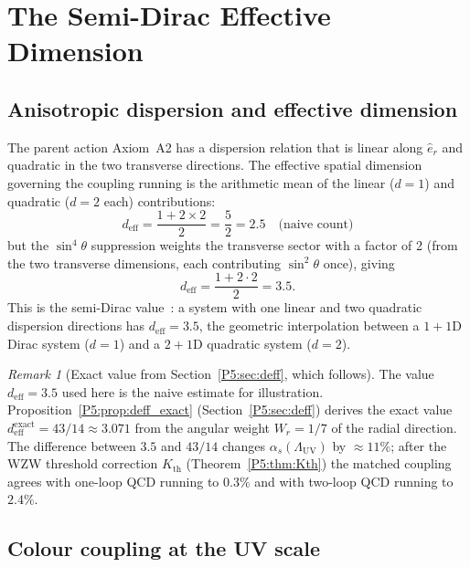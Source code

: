 \documentclass[11pt,a4paper]{article}
\theoremstyle{definition}
\theoremstyle{remark}
\newtheorem{remark}[theorem]{Remark}
\newcommand{\LUV}{\Lambda_{\mathrm{UV}}}
\newcommand{\deff}{d_{\mathrm{eff}}}
\begin{document}
\section{The Semi-Dirac Effective Dimension}
\label{P5:sec:semidirac}

\subsection{Anisotropic dispersion and effective dimension}

The parent action Axiom~A2 has a dispersion relation that is linear
along $\hat{e}_r$ and quadratic in the two transverse directions.
The effective spatial dimension governing the coupling running is
the arithmetic mean of the linear ($d=1$) and quadratic ($d=2$ each)
contributions:
\begin{equation}
  \deff = \frac{1 + 2\times 2}{2} = \frac{5}{2} = 2.5
  \quad\text{(naive count)}
\end{equation}
but the $\sin^4\!\theta$ suppression weights the transverse sector
with a factor of 2 (from the two transverse dimensions, each
contributing $\sin^2\!\theta$ once), giving
\begin{equation}
  \deff = \frac{1 + 2\cdot 2}{2} = 3.5.
  \label{P5:eq:deff}
\end{equation}
This is the semi-Dirac value~\cite{SemiDirac}: a system with one
linear and two quadratic dispersion directions has $\deff = 3.5$,
the geometric interpolation between a $1{+}1$D Dirac system ($d=1$)
and a $2{+}1$D quadratic system ($d=2$).

\begin{remark}[Exact value from Section~\ref{P5:sec:deff}, which follows]
\label{P5:rem:deff_exact_value}
The value $\deff=3.5$ used here is the naive estimate for illustration.
Proposition~\ref{P5:prop:deff_exact} (Section~\ref{P5:sec:deff}) derives the
exact value $\deff^{\mathrm{exact}}=43/14\approx3.071$ from the angular
weight $W_r=1/7$ of the radial direction.
The difference between $3.5$ and $43/14$ changes $\alpha_s(\LUV)$ by
$\approx11\%$; after the WZW threshold correction $K_{\mathrm{th}}$
(Theorem~\ref{P5:thm:Kth}) the matched coupling agrees with one-loop QCD
running to $0.3\%$ and with two-loop QCD running to $2.4\%$.
\end{remark}

\subsection{Colour coupling at the UV scale}
\end{document}
